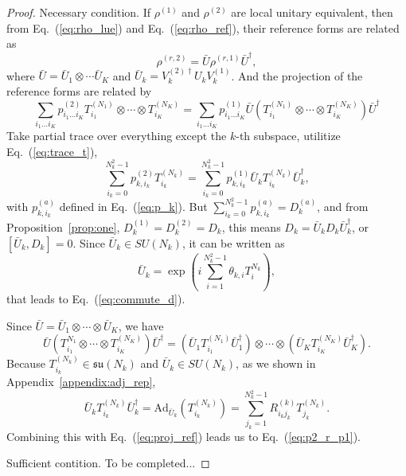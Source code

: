 \documentclass{article}
\begin{document}
\begin{proof}
  Necessary condition. If $\rho^{(1)}$ and $\rho^{(2)}$ are local unitary
  equivalent, then from Eq.~(\ref{eq:rho_lue}) and Eq.~(\ref{eq:rho_ref}),
  their reference forms are related as
  \begin{equation}
    \label{eq:ref_lue}
    \rho^{(r,2)} = \bar U\rho^{(r,1)}\bar U^\dagger,
  \end{equation}
  where $\bar U = \bar U_1\otimes\cdots\bar U_K$ and
  $\bar U_k = V^{(2)\dagger}_kU_kV^{(1)}_k$.  And the projection of the
  reference forms are related by
  \begin{equation}
    \label{eq:proj_ref}
    \sum_{i_1\ldots i_K}p^{(2)}_{i_1\ldots i_K}
    T^{(N_1)}_{i_1}\otimes\cdots\otimes T^{(N_K)}_{i_K}
    = \sum_{i_1\ldots i_K}p^{(1)}_{i_1\ldots i_K}
    \bar U\left(T^{(N_1)}_{i_1}\otimes\cdots\otimes T^{(N_K)}_{i_K}
    \right)\bar U^\dagger
  \end{equation}
  Take partial trace over everything except the $k$-th subspace,
  utilitize Eq.~(\ref{eq:trace_t}),
  \begin{equation}
    \label{eq:proj}
    \sum_{i_k=0}^{N_k^2-1}p^{(2)}_{k,i_k}T^{(N_k)}_{i_k} =
    \sum_{i_k=0}^{N_k^2-1}p^{(1)}_{k,i_k}\bar U_kT^{(N_k)}_{i_k}\bar U_k^\dagger,
  \end{equation}
  with $p^{(a)}_{k,i_k}$ defined in Eq.~(\ref{eq:p_k}).
  But $\sum_{i_k=0}^{N_k^2-1}p^{(a)}_{k,i_k} = D^{(a)}_k$, and from
  Proposition~\ref{prop:one}, $D^{(1)}_k = D^{(2)}_k = D_k$,
  this means $D_k = \bar U_k D_k \bar U_k^\dagger$, or
  $[\bar U_k, D_k] = 0$.  Since $\bar U_k\in SU(N_k)$, it can be
  written as
  \begin{equation}
    \bar U_k = \exp\left(i\sum_{i=1}^{N_k^2-1}\theta_{k,i}T^{N_k}_i\right),
  \end{equation}
  that leads to Eq.~(\ref{eq:commute_d}).

  Since $\bar U = \bar U_1\otimes\cdots\otimes \bar U_K$, we have
  \begin{equation}
    \bar U\left(T^{N_1}_{i_1}\otimes\cdots\otimes T^{(N_K)}_{i_K}\right)\bar U^\dagger
    = \left(\bar U_1T^{(N_1)}_{i_1}\bar U_1^\dagger\right)
    \otimes\cdots\otimes
    \left(\bar U_KT^{(N_K)}_{i_K}\bar U_K^\dagger\right).
  \end{equation}
  Because $T^{(N_k)}_{i_k} \in \mathfrak{su}(N_k)$ and $\bar U_k\in SU(N_k)$,
  as we shown in Appendix~\ref{appendix:adj_rep},
  \begin{equation}
    \bar U_kT^{(N_k)}_{i_k}\bar U_k^\dagger = \text{Ad}_{\bar U_k}(T^{(N_k)}_{i_k})
    = \sum_{j_k=1}^{N_k^2-1}R^{(k)}_{i_kj_k}T^{(N_k)}_{j_k}.
  \end{equation}
  Combining this with Eq.~(\ref{eq:proj_ref}) leads us to
  Eq.~(\ref{eq:p2_r_p1}).


  
  Sufficient contition.
  To be completed...
\end{proof}
\end{document}
